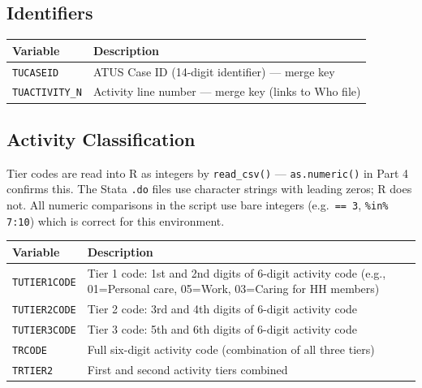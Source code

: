\documentclass[11pt, a4paper]{article}
\begin{document}
\subsection{Identifiers}
\begin{longtable}{L{3.5cm} L{11cm}}
\toprule \textbf{Variable} & \textbf{Description} \\ \midrule \endhead
\bottomrule \endfoot
\texttt{TUCASEID}     & ATUS Case ID (14-digit identifier) --- merge key \\
 \texttt{TUACTIVITY\_N}& Activity line number --- merge key (links to Who file) \\
\end{longtable}

\subsection{Activity Classification}

\begin{tcolorbox}[notebox]
\small Tier codes are read into R as integers by \texttt{read\_csv()} ---
\texttt{as.numeric()} in Part 4 confirms this. The Stata \texttt{.do} files use
character strings with leading zeros; R does not. All numeric comparisons in the
script use bare integers (e.g.\ \texttt{== 3}, \texttt{\%in\% 7:10}) which is
correct for this environment.
\end{tcolorbox}

\vspace{1mm}
\begin{longtable}{L{3.5cm} L{12cm}}
\toprule \textbf{Variable} & \textbf{Description} \\ \midrule \endhead
\bottomrule \endfoot
\texttt{TUTIER1CODE} & Tier 1 code: 1st and 2nd digits of 6-digit activity code
                       (e.g., 01=Personal care, 05=Work, 03=Caring for HH members) \\
 \texttt{TUTIER2CODE} & Tier 2 code: 3rd and 4th digits of 6-digit activity code \\
\texttt{TUTIER3CODE} & Tier 3 code: 5th and 6th digits of 6-digit activity code \\
 \texttt{TRCODE}      & Full six-digit activity code (combination of all three tiers) \\
\texttt{TRTIER2}     & First and second activity tiers combined \\
\end{longtable}
\end{document}

